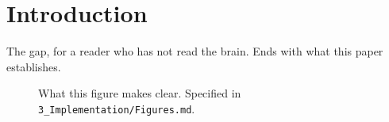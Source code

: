 \section{Introduction}
\label{sec:introduction}

The gap, for a reader who has not read the brain. Ends with what this paper establishes.

\begin{figure}[t]
  \centering
  \caption{What this figure makes clear. Specified in \texttt{3\_Implementation/Figures.md}.}
  \label{fig:overview}
\end{figure}
